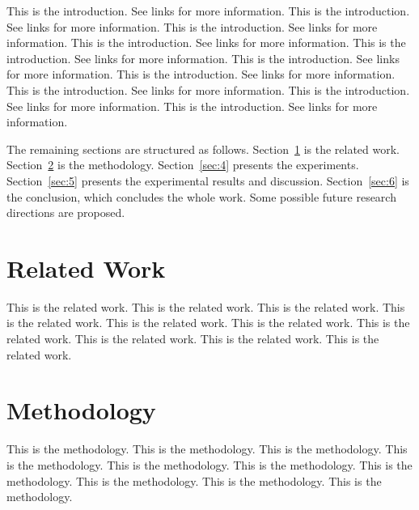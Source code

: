 \documentclass[sigconf]{acmart}
\begin{document}
This is the introduction. See links \cite{liu2024efficient, yang2026builder, yang2025checker} for more information. This is the introduction. See links \cite{liu2024efficient, yang2026builder, yang2025checker} for more information. This is the introduction. See links \cite{liu2024efficient, yang2026builder, yang2025checker} for more information. This is the introduction. See links \cite{liu2024efficient, yang2026builder, yang2025checker} for more information. This is the introduction. See links \cite{liu2024efficient, yang2026builder, yang2025checker} for more information. This is the introduction. See links \cite{liu2024efficient, yang2026builder, yang2025checker} for more information. This is the introduction. See links \cite{liu2024efficient, yang2026builder, yang2025checker} for more information. This is the introduction. See links \cite{liu2024efficient, yang2026builder, yang2025checker} for more information. This is the introduction. See links \cite{liu2024efficient, yang2026builder, yang2025checker} for more information. This is the introduction. See links \cite{liu2024efficient, yang2026builder, yang2025checker} for more information. 

The remaining sections are structured as follows. Section~\ref{sec:2} is the related work. Section~\ref{sec:3} is the methodology. Section~\ref{sec:4} presents the experiments. Section~\ref{sec:5} presents the experimental results and discussion. Section~\ref{sec:6} is the conclusion, which concludes the whole work. Some possible future research directions are proposed. 

\section{Related Work}
\label{sec:2}

This is the related work. This is the related work. This is the related work. This is the related work. This is the related work. This is the related work. This is the related work. This is the related work. This is the related work. This is the related work. 

\section{Methodology}
\label{sec:3}

This is the methodology. This is the methodology. This is the methodology. This is the methodology. This is the methodology. This is the methodology. This is the methodology. This is the methodology. This is the methodology. This is the methodology. 
\end{document}
